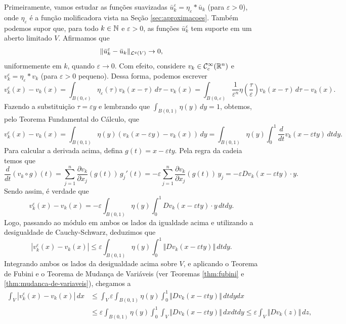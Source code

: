 \begin{prf}
    Primeiramente, vamos estudar as funções suavizadas $\bar u_k^\varepsilon = \eta_\varepsilon * \bar u_k$ (para $\varepsilon > 0$), onde $\eta_\varepsilon$ é a função molificadora vista na Seção \ref{sec:aproximacoes}.
    Também podemos supor que, para todo $k \in \mathbb{N}$ e $\varepsilon > 0$, as funções $\bar u_k^\varepsilon$ tem suporte em um aberto limitado $V$.
    Afirmamos que
    \[
        \Vert \bar u_k^\varepsilon - \bar u_k \Vert_{\mathcal{L}^q(V)} \to 0,
    \]
    uniformemente em $k$, quando $\varepsilon \to 0$.
    Com efeito, considere $v_k \in \mathcal{C}^{\infty}_c(\mathbb{R}^n)$ e $v_k^\varepsilon = \eta_\varepsilon * v_k$ (para $\varepsilon > 0$ pequeno).
    Dessa forma, podemos escrever
    \[
        v_k^\varepsilon(x) - v_k(x) = \int_{B(0,\varepsilon)} \eta_\varepsilon(\tau) v_k (x - \tau) \,d\tau - v_k(x)  = \int_{B(0,\varepsilon)} \frac{1}{\varepsilon^n} \eta \left( \frac{\tau}{\varepsilon} \right) v_k (x - \tau) \,d\tau - v_k(x).
    \]
    Fazendo a substituição $\tau = \varepsilon y$ e lembrando que $\int_{B(0,1)} \eta(y) \,dy = 1$, obtemos, pelo Teorema Fundamental do Cálculo, que
    \[
        v_k^\varepsilon(x) - v_k(x) = \int_{B(0,1)} \eta(y) \left( v_k(x - \varepsilon y) - v_k(x) \right) \,dy = \int_{B(0,1)} \eta(y) \int_0^1 \frac{d}{dt}v_k(x - \varepsilon t y) \,dt dy.
    \]
    Para calcular a derivada acima, defina $g(t) = x - \varepsilon t y$. Pela regra da cadeia temos que
    \[
        \frac{d}{dt} (v_k \circ g)(t) = \sum_{j=1}^n \dfrac{\partial v_k}{\partial x_j} (g(t)) \, g_j'(t) = -\varepsilon\sum_{j=1}^{n} \dfrac{\partial v_k}{\partial x_j}(g(t)) \,y_j = -\varepsilon Dv_k(x - \varepsilon ty) \cdot y.
    \]
    Sendo assim, é verdade que
    \[
        v_k^\varepsilon(x) - v_k(x) = -\varepsilon \int_{B(0,1)} \eta(y) \int_0^1 Dv_k(x - \varepsilon ty) \cdot y \,dtdy.
    \]
    Logo, passando ao módulo em ambos os lados da igualdade acima e utilizando a desigualdade de Cauchy-Schwarz, deduzimos que
    \[
        |v_k^\varepsilon(x) - v_k(x)| \leqslant \varepsilon \int_{B(0,1)} \eta(y) \int_0^1 \Vert Dv_k(x - \varepsilon ty) \Vert \,dtdy.
    \]
    Integrando ambos os lados da desigualdade acima sobre $V$, e aplicando o Teorema de Fubini e o Teorema de Mudança de Variáveis (ver Teoremas \ref{thm:fubini} e \ref{thm:mudanca-de-variaveis}), chegamos a
    \[
        \begin{aligned}
            \int_{V} |v_k^\varepsilon(x) - v_k(x)|\,dx &\leqslant \int_{V} \varepsilon \int_{B(0,1)} \eta(y) \int_0^1 \Vert Dv_k(x - \varepsilon ty) \Vert \,dtdydx\\
            &\leqslant \varepsilon \int_{B(0,1)} \eta(y) \int_0^1 \int_{V} \Vert Dv_k(x - \varepsilon ty) \Vert \,dxdtdy \leqslant \varepsilon \int_{V} \Vert Dv_k(z) \Vert    \,dz,

\end{aligned}\]
\end{prf}
